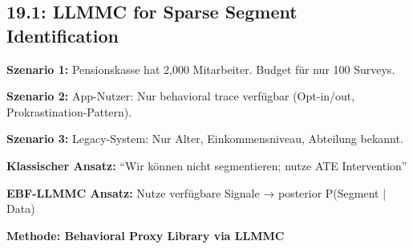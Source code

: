 \subsection{19.1: LLMMC for Sparse Segment Identification}
\label{subsec:19-llmmc-sparse}

\begin{tcolorbox}[colback=blue!5!white, colframe=blue!75!black, title=\textbf{Problem: Was wenn kein Screener-Data verfügbar?}]

\textbf{Szenario 1:} Pensionskasse hat 2,000 Mitarbeiter. Budget für nur 100 Surveys.

\textbf{Szenario 2:} App-Nutzer: Nur behavioral trace verfügbar (Opt-in/out, Prokrastination-Pattern).

\textbf{Szenario 3:} Legacy-System: Nur Alter, Einkommensniveau, Abteilung bekannt.

\textbf{Klassischer Ansatz:} ``Wir können nicht segmentieren; nutze ATE Intervention''

\textbf{EBF-LLMMC Ansatz:} Nutze verfügbare Signale → posterior P(Segment | Data)

\end{tcolorbox}

\textbf{Methode: Behavioral Proxy Library via LLMMC}

